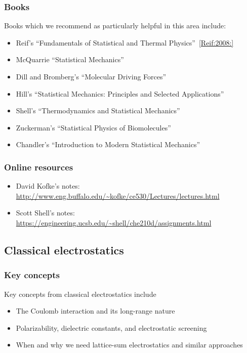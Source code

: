 \documentclass[9pt,bestpractices]{livecoms}
\begin{document}
\subsubsection{Books}

Books which we recommend as particularly helpful in this area include:
\begin{itemize}
\item Reif's ``Fundamentals of Statistical and Thermal Physics''~\ref{Reif:2008:}
\item McQuarrie ``Statistical Mechanics''~\cite{McQuarrie:2000:}
\item Dill and Bromberg's ``Molecular Driving Forces''~\cite{DillBook}
\item Hill's ``Statistical Mechanics: Principles and Selected Applications''~\cite{Hill:1987:}
\item Shell's ``Thermodynamics and Statistical Mechanics''~\cite{ShellBook}
\item Zuckerman's ``Statistical Physics of Biomolecules''~\cite{Zuckerman:2010:}
\item Chandler's ``Introduction to Modern Statistical Mechanics''~\cite{Chandler:1987:}
\end{itemize}

\subsubsection{Online resources}
\begin{itemize}
\item David Kofke's notes: \url{http://www.eng.buffalo.edu/~kofke/ce530/Lectures/lectures.html}
\item Scott Shell's notes: \url{https://engineering.ucsb.edu/~shell/che210d/assignments.html}
\end{itemize}

\subsection{Classical electrostatics}
\label{sec:classical_electrostatics}
\subsubsection{Key concepts}
Key concepts from classical electrostatics include
\begin{itemize}
\item The Coulomb interaction and its long-range nature
\item Polarizability, dielectric constants, and electrostatic screening
\item When and why we need lattice-sum electrostatics and similar approaches
\end{itemize}
\end{document}
